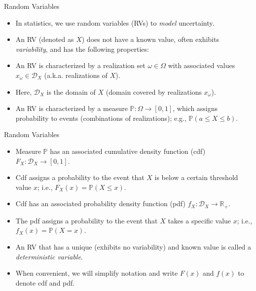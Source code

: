 \documentclass[9pt]{beamer}
\begin{document}
\begin{frame}{Random Variables}
\begin{itemize}
 \setlength{\itemsep}{5pt}
\item In statistics, we use random variables (RVs) to {\em model} uncertainty. 

\item An RV (denoted as $X$) does not have a known value, often exhibits {\em variability}, and has the following properties: 
\end{itemize}
\begin{block}{}
\begin{itemize}
 \setlength{\itemsep}{10pt}
\item An RV is characterized by a realization set $\omega \in \Omega$ with associated values $x_\omega\in \mathcal{D}_X$ (a.k.a. realizations of $X$).  

\item Here, $\mathcal{D}_X$ is the domain of $X$ (domain covered by realizations $x_\omega$).

\item An RV is characterized by a measure $\mathbb{P}:\Omega\to [0,1]$, which assigns probability to events (combinations of realizations); e.g., $\mathbb{P}(a\leq X\leq b)$.
\end{itemize}
\end{block}
\end{frame}

\begin{frame}{Random Variables}
\begin{block}{}
\begin{itemize}
 \setlength{\itemsep}{10pt}
\item Measure $\mathbb{P}$ has an associated cumulative density function (cdf) $F_X:\mathcal{D}_X\to [0,1]$. 

\item Cdf assigns a probability to the event that $X$ is below a certain threshold value $x$; i.e., $F_X(x)=\mathbb{P}(X\leq x)$.
\item Cdf has an associated probability density function (pdf) $f_X:\mathcal{D}_X\to \mathbb{R}_+$. 

\item The pdf assigns a probability to the event that $X$ takes a specific value $x$; i.e., $f_X(x)=\mathbb{P}(X=x)$.  
\end{itemize}
\end{block}
\begin{itemize}
\item An RV that has a unique (exhibits no variability) and known value is called a {\em deterministic variable}. 
\item When convenient, we will simplify notation and write $F(x)$ and $f(x)$ to denote cdf and pdf. 
\end{itemize}
\end{frame}
\end{document}
